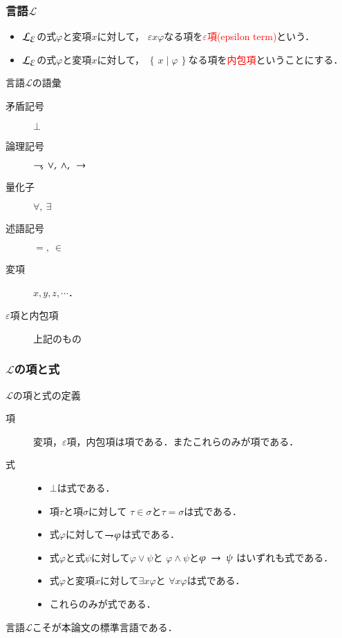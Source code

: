 \documentclass[dvipdfmx,10pt,notheorems]{beamer}
\theoremstyle{definition}
\newcommand{\lang}[1]{\mathcal{L}_{\scalebox{1.2}{$#1$}}} %
\newcommand{\Set}[2]{\left\{\, #1 \mid #2\, \right\}} %
\newcommand{\negation}{\rightharpoondown\hspace{-0.25em}} %
\newcommand{\rarrow}{\hspace{0.25em}\rightarrow\hspace{0.25em}} %
\begin{document}
\begin{frame}\frametitle{言語$\mathcal{L}$}
	\begin{itemize}
		\item $\lang{\varepsilon}$の式$\varphi$と変項$x$に対して，
			$\varepsilon x \varphi$なる項を\textcolor{red}{$\varepsilon$項(epsilon term)}という．
			
		\item $\lang{\varepsilon}$の式$\varphi$と変項$x$に対して，
			$\Set{x}{\varphi}$なる項を\textcolor{red}{内包項}ということにする．
	\end{itemize}
	
	\begin{exampleblock}{言語$\mathcal{L}$の語彙}
		\begin{description}
			\item[矛盾記号] $\bot$
			\item[論理記号] $\negation,\ \vee,\ \wedge,\ \rarrow$
			\item[量化子] $\forall,\ \exists$
			\item[述語記号] $=,\ \in$
			\item[変項] $x,y,z,\cdots$．
			\item[$\varepsilon$項と内包項] 上記のもの 
		\end{description}
	\end{exampleblock}
\end{frame}

\begin{frame}\frametitle{$\mathcal{L}$の項と式}

	\begin{exampleblock}{$\mathcal{L}$の項と式の定義}
		\begin{description}
			\item[項] 変項，$\varepsilon$項，内包項は項である．またこれらのみが項である．
			
			\item[式] 
				\begin{itemize}
					\item $\bot$は式である．
					\item 項$\tau$と項$\sigma$に対して
						$\tau \in \sigma$と$\tau = \sigma$は式である．
					\item 式$\varphi$に対して$\negation \varphi$は式である．
					\item 式$\varphi$と式$\psi$に対して$\varphi \vee \psi$と
						$\varphi \wedge \psi$と$\varphi \rarrow \psi$
						はいずれも式である．
					\item 式$\varphi$と変項$x$に対して$\exists x \varphi$と
						$\forall x \varphi$は式である．
					\item これらのみが式である．
				\end{itemize}
		\end{description}
	\end{exampleblock}
	
	言語$\mathcal{L}$こそが本論文の標準言語である．
	
\end{frame}
\end{document}
